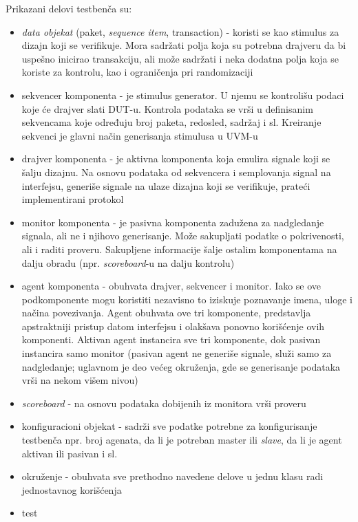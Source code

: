 Prikazani delovi testbenča su:
\begin{itemize}
\item \emph{data objekat} (paket, \emph{sequence item}, transaction) - koristi
  se kao stimulus za dizajn koji se verifikuje. Mora sadržati polja koja su
  potrebna drajveru da bi uspešno inicirao transakciju, ali može sadržati i neka
  dodatna polja koja se koriste za kontrolu, kao i ograničenja pri randomizaciji
\item sekvencer komponenta - je stimulus generator. U njemu se kontrolišu podaci
  koje će drajver slati DUT-u. Kontrola podataka se vrši u definisanim
  sekvencama koje određuju broj paketa, redosled, sadržaj i sl. Kreiranje
  sekvenci je glavni način generisanja stimulusa u UVM-u
\item drajver komponenta - je aktivna komponenta koja emulira signale koji se
  šalju dizajnu. Na osnovu podataka od sekvencera i semplovanja signal na
  interfejsu, generiše signale na ulaze dizajna koji se verifikuje, prateći
  implementirani protokol
\item monitor komponenta - je pasivna komponenta zadužena za nadgledanje
  signala, ali ne i njihovo generisanje. Može sakupljati podatke o pokrivenosti,
  ali i raditi proveru. Sakupljene informacije šalje ostalim komponentama na
  dalju obradu (npr. \emph{scoreboard}-u na dalju kontrolu)
\item agent komponenta - obuhvata drajver, sekvencer i monitor. Iako se ove
  podkomponente mogu koristiti nezavisno to iziskuje poznavanje imena, uloge i
  načina povezivanja. Agent obuhvata ove tri komponente, predstavlja
  apstraktniji pristup datom interfejsu i olakšava ponovno korišćenje ovih
  komponenti. Aktivan agent instancira sve tri komponente, dok pasivan
  instancira samo monitor (pasivan agent ne generiše signale, služi samo za
  nadgledanje; uglavnom je deo većeg okruženja, gde se generisanje podataka vrši
  na nekom višem nivou)
\item \emph{scoreboard} - na osnovu podataka dobijenih iz monitora vrši proveru
\item konfiguracioni objekat - sadrži sve podatke potrebne za konfigurisanje
  testbenča npr. broj agenata, da li je potreban master ili \emph{slave}, da li
  je agent aktivan ili pasivan i sl.
\item okruženje - obuhvata sve prethodno navedene delove u jednu klasu radi
  jednostavnog korišćenja
\item test
\end{itemize}

